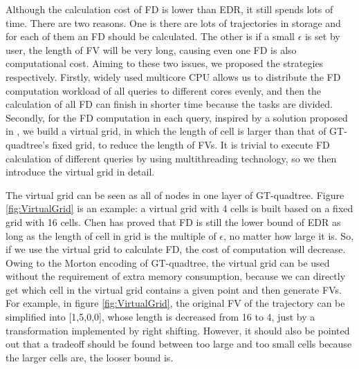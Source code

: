 \documentclass[conference]{IEEEtran}
\begin{document}
Although the calculation cost of FD is lower than EDR, it still spends lots of time. There are two reasons. One is there are lots of trajectories in storage and for each of them an FD should be calculated. The other is if a small $\epsilon$ is set by user, the length of FV will be very long, causing even one FD is also computational cost. Aiming to these two issues, we proposed the strategies respectively. Firstly, widely used multicore CPU allows us to distribute the FD computation workload of all queries to different cores evenly, and then the calculation of all FD can finish in shorter time because the tasks are divided. Secondly, for the FD computation in each query, inspired by a solution proposed in \cite{DBLP:conf/sigmod/ChenOO05}, we build a virtual grid, in which the length of cell is larger than that of GT-quadtree's fixed grid, to reduce the length of FVs. It is trivial to execute FD calculation of different queries by using multithreading technology, so we then introduce the virtual grid in detail. 

The virtual grid can be seen as all of nodes in one layer of GT-quadtree. Figure \ref{fig:VirtualGrid} is an example: a virtual grid with 4 cells is built based on a fixed grid with 16 cells. Chen\cite{DBLP:conf/sigmod/ChenOO05} has proved that FD is still the lower bound of EDR as long as the length of cell in grid is the multiple of $\epsilon$, no matter how large it is. So, if we use the virtual grid to calculate FD, the cost of computation will decrease. Owing to the Morton encoding of GT-quadtree, the virtual grid can be used without the requirement of extra memory consumption, because we can directly get which cell in the virtual grid contains a given point and then generate FVs. For example, in figure \ref{fig:VirtualGrid}, the original FV of the trajectory can be simplified into [1,5,0,0], whose length is decreased from 16 to 4, just by a transformation implemented by right shifting. However, it should also be pointed out that a tradeoff should be found between too large and too small cells because the larger cells are, the looser bound is. 
\end{document}
